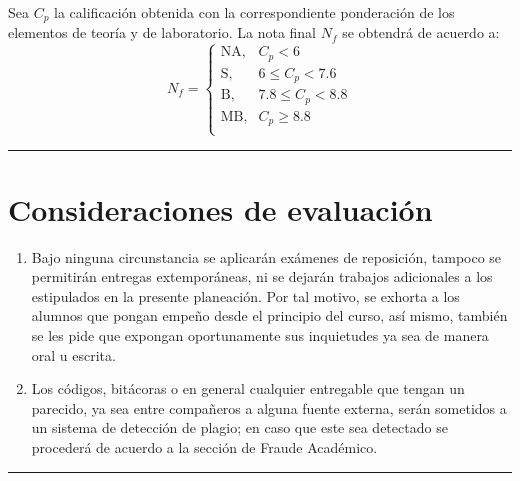 \documentclass[letterpaper, 11pt]{article}
\begin{document}
Sea $C_p$ la calificación obtenida con la correspondiente ponderación de los elementos de teoría y de laboratorio. La nota final $N_f$ se obtendrá de acuerdo a:
	\begin{equation}
	N_f = 
		\begin{cases}
		  \text{NA}, & C_p < 6 \\
		  \text{S},  & 6\leq C_p < 7.6\\
		  \text{B},  & 7.8\leq C_p < 8.8\\
		  \text{MB},  & C_p \geq 8.8\\
		\end{cases}
	\end{equation}

\vspace* {3pt}
\hrule
\vspace* {2pt}

\section{Consideraciones de evaluación}
\begin{enumerate}
 \item Bajo ninguna circunstancia se aplicarán exámenes de reposición, tampoco se permitirán entregas extemporáneas, ni se dejarán trabajos adicionales a los estipulados en la presente planeación. Por tal motivo, se exhorta a los alumnos que pongan empeño desde el principio del curso, así mismo, también se les pide que expongan oportunamente sus inquietudes ya sea de manera oral u escrita.
 \item Los códigos, bitácoras o en general cualquier entregable que tengan un parecido, ya sea entre compañeros a alguna fuente externa, serán sometidos a un sistema de detección de plagio; en caso que este sea detectado se procederá de acuerdo a la sección de Fraude Académico.
\end{enumerate}

\vspace*{5pt}
\hrule
\end{document}
